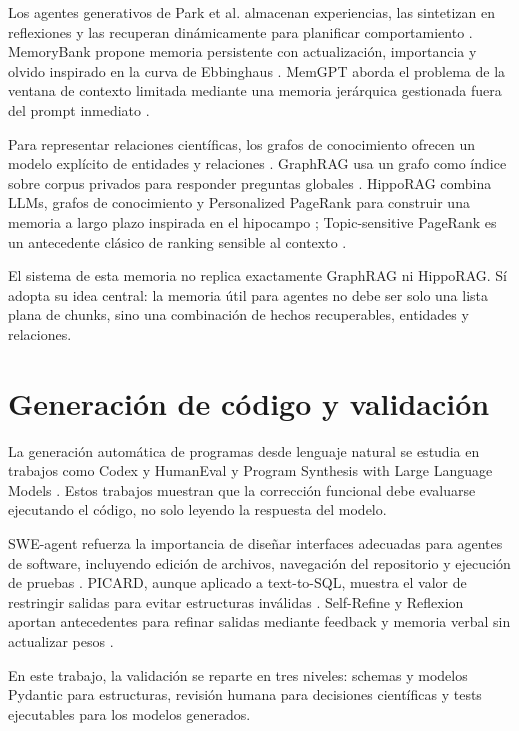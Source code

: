 Los agentes generativos de Park et al. almacenan experiencias, las sintetizan en
reflexiones y las recuperan dinámicamente para planificar comportamiento
\cite{park2023generativeagents}. MemoryBank propone memoria persistente con
actualización, importancia y olvido inspirado en la curva de Ebbinghaus
\cite{zhong2023memorybank}. MemGPT aborda el problema de la ventana de contexto
limitada mediante una memoria jerárquica gestionada fuera del prompt inmediato
\cite{packer2023memgpt}.

Para representar relaciones científicas, los grafos de conocimiento ofrecen un
modelo explícito de entidades y relaciones \cite{hogan2021knowledgegraphs}.
GraphRAG usa un grafo como índice sobre corpus privados para responder preguntas
globales \cite{edge2024graphrag}. HippoRAG combina LLMs, grafos de conocimiento
y Personalized PageRank para construir una memoria a largo plazo inspirada en el
hipocampo \cite{gutierrez2024hipporag}; Topic-sensitive PageRank es un
antecedente clásico de ranking sensible al contexto \cite{haveliwala2002topicsensitive}.

El sistema de esta memoria no replica exactamente GraphRAG ni HippoRAG. Sí adopta
su idea central: la memoria útil para agentes no debe ser solo una lista plana de
chunks, sino una combinación de hechos recuperables, entidades y relaciones.

\section{Generación de código y validación}

La generación automática de programas desde lenguaje natural se estudia en
trabajos como Codex y HumanEval \cite{chen2021codex} y Program Synthesis with
Large Language Models \cite{austin2021programsynthesis}. Estos trabajos muestran
que la corrección funcional debe evaluarse ejecutando el código, no solo leyendo
la respuesta del modelo.

SWE-agent refuerza la importancia de diseñar interfaces adecuadas para agentes
de software, incluyendo edición de archivos, navegación del repositorio y
ejecución de pruebas \cite{yang2024sweagent}. PICARD, aunque aplicado a
text-to-SQL, muestra el valor de restringir salidas para evitar estructuras
inválidas \cite{scholak2021picard}. Self-Refine y Reflexion aportan antecedentes
para refinar salidas mediante feedback y memoria verbal sin actualizar pesos
\cite{madaan2023selfrefine,shinn2023reflexion}.

En este trabajo, la validación se reparte en tres niveles: schemas y modelos
Pydantic para estructuras, revisión humana para decisiones científicas y tests
ejecutables para los modelos generados.
